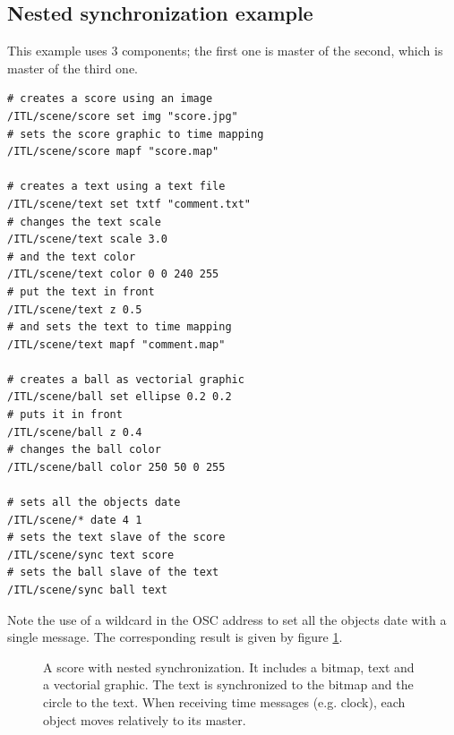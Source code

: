 \documentclass{article}
\begin{document}
{{\subsection{Nested synchronization example}

This example uses 3 components; the first one is master of the second, which is master of the third one. 

{\small \begin{verbatim}
# creates a score using an image
/ITL/scene/score set img "score.jpg"
# sets the score graphic to time mapping 
/ITL/scene/score mapf "score.map"

# creates a text using a text file
/ITL/scene/text set txtf "comment.txt"
# changes the text scale
/ITL/scene/text scale 3.0
# and the text color
/ITL/scene/text color 0 0 240 255
# put the text in front
/ITL/scene/text z 0.5
# and sets the text to time mapping 
/ITL/scene/text mapf "comment.map"

# creates a ball as vectorial graphic
/ITL/scene/ball set ellipse 0.2 0.2
# puts it in front
/ITL/scene/ball z 0.4
# changes the ball color
/ITL/scene/ball color 250 50 0 255

# sets all the objects date
/ITL/scene/* date 4 1
# sets the text slave of the score
/ITL/scene/sync text score
# sets the ball slave of the text
/ITL/scene/sync ball text
\end{verbatim}
}Note the use of a wildcard in the OSC address to set all the objects date with a single message. 
The corresponding result is given by figure \ref{fig:scene}.

\begin{figure}[htbp]
\centerline{}
\caption{A score with nested synchronization. It includes a bitmap, text and a vectorial graphic. The text is synchronized to the bitmap and the circle to the text. When receiving time messages (e.g. clock), each object moves relatively to its master.}
\label{fig:scene}
\end{figure}



}}
\end{document}

